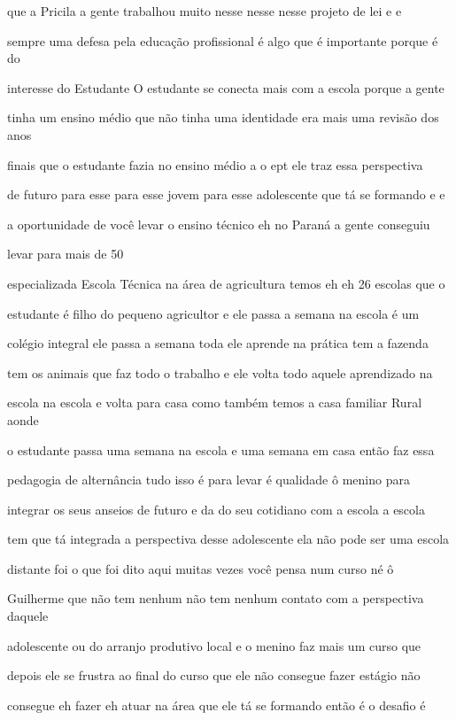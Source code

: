 \documentclass[a4paper,12pt]{article}
\begin{document}
que a Pricila a gente trabalhou muito nesse nesse nesse projeto de lei e e

sempre uma defesa pela educação profissional é algo que é importante porque é do

interesse do Estudante O estudante se conecta mais com a escola porque a gente

tinha um ensino médio que não tinha uma identidade era mais uma revisão dos anos

finais que o estudante fazia no ensino médio a o ept ele traz essa perspectiva

de futuro para esse para esse jovem para esse adolescente que tá se formando e e

a oportunidade de você levar o ensino técnico eh no Paraná a gente conseguiu

levar para mais de 50%

especializada Escola Técnica na área de agricultura temos eh eh 26 escolas que o

estudante é filho do pequeno agricultor e ele passa a semana na escola é um

colégio integral ele passa a semana toda ele aprende na prática tem a fazenda

tem os animais que faz todo o trabalho e ele volta todo aquele aprendizado na

escola na escola e volta para casa como também temos a casa familiar Rural aonde

o estudante passa uma semana na escola e uma semana em casa então faz essa

pedagogia de alternância tudo isso é para levar é qualidade ô menino para

integrar os seus anseios de futuro e da do seu cotidiano com a escola a escola

tem que tá integrada a perspectiva desse adolescente ela não pode ser uma escola

distante foi o que foi dito aqui muitas vezes você pensa num curso né ô

Guilherme que não tem nenhum não tem nenhum contato com a perspectiva daquele

adolescente ou do arranjo produtivo local e o menino faz mais um curso que

depois ele se frustra ao final do curso que ele não consegue fazer estágio não

consegue eh fazer eh atuar na área que ele tá se formando então é o desafio é
\end{document}
